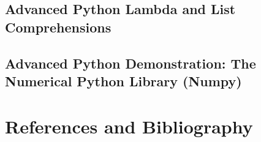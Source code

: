 \documentclass[11pt]{article}
\begin{document}
\subsection{Advanced Python Lambda and List Comprehensions}

\subsection{Advanced Python Demonstration: The Numerical Python Library (Numpy)}
























\section{References and Bibliography}






\end{document}
